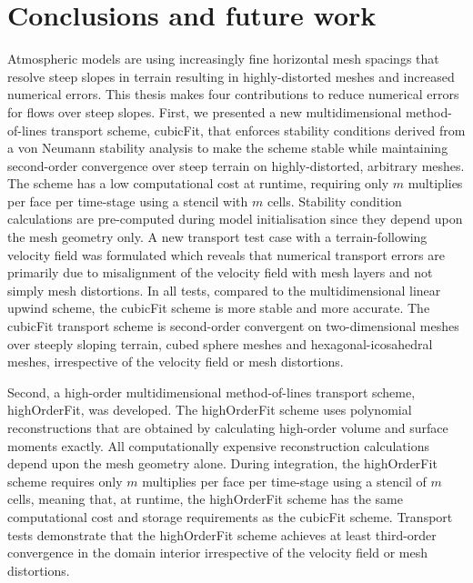 \chapter{Conclusions and future work}
\label{ch:discussion}

Atmospheric models are using increasingly fine horizontal mesh spacings that resolve steep slopes in terrain resulting in highly-distorted meshes and increased numerical errors.
This thesis makes four contributions to reduce numerical errors for flows over steep slopes.
First, we presented a new multidimensional method-of-lines transport scheme, cubicFit, that enforces stability conditions derived from a von Neumann stability analysis to make the scheme stable while maintaining second-order convergence over steep terrain on highly-distorted, arbitrary meshes.
The scheme has a low computational cost at runtime, requiring only $m$ multiplies per face per time-stage using a stencil with $m$ cells.
Stability condition calculations are pre-computed during model initialisation since they depend upon the mesh geometry only.
A new transport test case with a terrain-following velocity field was formulated which reveals that numerical transport errors are primarily due to misalignment of the velocity field with mesh layers and not simply mesh distortions.
In all tests, compared to the multidimensional linear upwind scheme, the cubicFit scheme is more stable and more accurate.
The cubicFit transport scheme is second-order convergent on two-dimensional meshes over steeply sloping terrain, cubed sphere meshes and hexagonal-icosahedral meshes, irrespective of the velocity field or mesh distortions.

Second, a high-order multidimensional method-of-lines transport scheme, highOrderFit, was developed.
The highOrderFit scheme uses \kexact{} polynomial reconstructions that are obtained by calculating high-order volume and surface moments exactly.
All computationally expensive reconstruction calculations depend upon the mesh geometry alone.
During integration, the highOrderFit scheme requires only $m$ multiplies per face per time-stage using a stencil of $m$ cells, meaning that, at runtime, the highOrderFit scheme has the same computational cost and storage requirements as the cubicFit scheme.
Transport tests demonstrate that the highOrderFit scheme achieves at least third-order convergence in the domain interior irrespective of the velocity field or mesh distortions.

